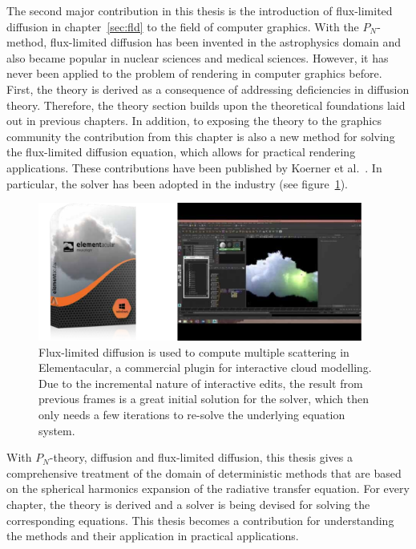 The second major contribution in this thesis is the introduction of flux-limited diffusion in chapter~\ref{sec:fld} to the field of computer graphics. With the $P_N$-method, flux-limited diffusion has been invented in the astrophysics domain and also became popular in nuclear sciences and medical sciences. However, it has never been applied to the problem of rendering in computer graphics before. First, the theory is derived as a consequence of addressing deficiencies in diffusion theory. Therefore, the theory section builds upon the theoretical foundations laid out in previous chapters. In addition, to exposing the theory to the graphics community the contribution from this chapter is also a new method for solving the flux-limited diffusion equation, which allows for practical rendering applications. These contributions have been published by Koerner et al.~\cite{Koerner14}. In particular, the solver has been adopted in the industry (see figure~\ref{fig:fld_conclusion_elementacular_1}).
\begin{figure}[h]
\centering
\includegraphics[width=0.95\textwidth]{07_conclusion/figures/fig_elementacular.pdf}
\caption{Flux-limited diffusion is used to compute multiple scattering in Elementacular\protect\footnotemark, a commercial plugin for interactive cloud modelling. Due to the incremental nature of interactive edits, the result from previous frames is a great initial solution for the solver, which then only needs a few iterations to re-solve the underlying equation system.}
\label{fig:fld_conclusion_elementacular_1}
\end{figure}


With $P_N$-theory, diffusion and flux-limited diffusion, this thesis gives a comprehensive treatment of the domain of deterministic methods that are based on the spherical harmonics expansion of the radiative transfer equation. For every chapter, the theory is derived and a solver is being devised for solving the corresponding equations. This thesis becomes a contribution for understanding the methods and their application in practical applications. 

